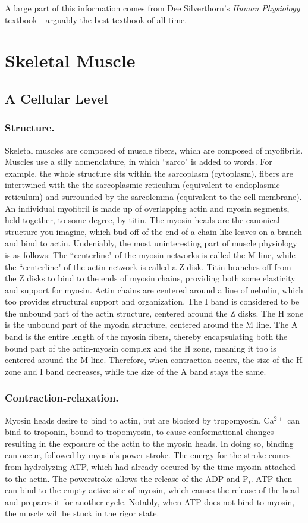 \documentclass[12pt]{report}
\begin{document}
A large part of this information comes from Dee Silverthorn's \textit{Human Physiology} textbook---arguably the best textbook of all time. 

\section{Skeletal Muscle}
\subsection{A Cellular Level}
\subsubsection{Structure.}
Skeletal muscles are composed of muscle fibers, which are composed of myofibrils. Muscles use a silly nomenclature, in which ``sarco" is added to words. For example, the whole structure sits within the sarcoplasm (cytoplasm), fibers are intertwined with the the sarcoplasmic reticulum (equivalent to endoplasmic reticulum) and surrounded by the sarcolemma (equivalent to the cell membrane). An individual myofibril is made up of overlapping actin and myosin segments, held together, to some degree, by titin. The myosin heads are the canonical structure you imagine, which bud off of the end of a chain like leaves on a branch and bind to actin. Undeniably, the most uninteresting part of muscle physiology is as follows: The ``centerline" of the myosin networks is called the M line, while the ``centerline" of the actin network is called a Z disk. Titin branches off from the Z disks to bind to the ends of myosin chains, providing both some elasticity and support for myosin. Actin chains are centered around a line of nebulin, which too provides structural support and organization. The I band is considered to be the unbound part of the actin structure, centered around the Z disks. The H zone is the unbound part of the myosin structure, centered around the M line. The A band is the entire length of the myosin fibers, thereby encapsulating both the bound part of the actin-myosin complex and the H zone, meaning it too is centered around the M line. Therefore, when contraction occurs, the size of the H zone and I band decreases, while the size of the A band stays the same.

\subsubsection{Contraction-relaxation.}
Myosin heads desire to bind to actin, but are blocked by tropomyosin. Ca$^{2+}$ can bind to troponin, bound to tropomyosin, to cause conformational changes resulting in the exposure of the actin to the myosin heads. In doing so, binding can occur, followed by myosin's power stroke. The energy for the stroke comes from hydrolyzing ATP, which had already occured by the time myosin attached to the actin. The powerstroke allows the release of the ADP and P$_i$. ATP then can bind to the empty active site of myosin, which causes the release of the head and prepares it for another cycle. Notably, when ATP does not bind to myosin, the muscle will be stuck in the rigor state.\newline
\end{document}
